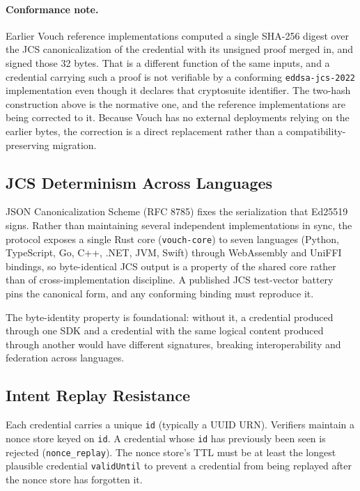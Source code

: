 \documentclass[11pt,a4paper]{article}
\begin{document}
\paragraph{Conformance note.} Earlier Vouch reference implementations computed a single SHA-256 digest over the JCS canonicalization of the credential with its unsigned proof merged in, and signed those 32 bytes. That is a different function of the same inputs, and a credential carrying such a proof is not verifiable by a conforming \texttt{eddsa-jcs-2022} implementation even though it declares that cryptosuite identifier. The two-hash construction above is the normative one, and the reference implementations are being corrected to it. Because Vouch has no external deployments relying on the earlier bytes, the correction is a direct replacement rather than a compatibility-preserving migration.

\subsection{JCS Determinism Across Languages}

JSON Canonicalization Scheme (RFC 8785) fixes the serialization that Ed25519 signs. Rather than maintaining several independent implementations in sync, the protocol exposes a single Rust core (\texttt{vouch-core}) to seven languages (Python, TypeScript, Go, C++, .NET, JVM, Swift) through WebAssembly and UniFFI bindings, so byte-identical JCS output is a property of the shared core rather than of cross-implementation discipline. A published JCS test-vector battery~\cite{pad039} pins the canonical form, and any conforming binding must reproduce it.

The byte-identity property is foundational: without it, a credential produced through one SDK and a credential with the same logical content produced through another would have different signatures, breaking interoperability and federation across languages.

\subsection{Intent Replay Resistance}

Each credential carries a unique \verb|id| (typically a UUID URN). Verifiers maintain a nonce store keyed on \verb|id|. A credential whose \verb|id| has previously been seen is rejected (\verb|nonce_replay|). The nonce store's TTL must be at least the longest plausible credential \verb|validUntil| to prevent a credential from being replayed after the nonce store has forgotten it.
\end{document}
